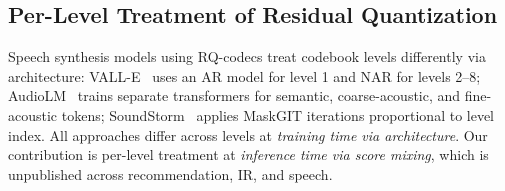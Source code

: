 \subsection{Per-Level Treatment of Residual Quantization}

Speech synthesis models using RQ-codecs treat codebook levels differently via architecture: VALL-E~\cite{wang2023valle} uses an AR model for level 1 and NAR for levels 2–8; AudioLM~\cite{borsos2023audiolm} trains separate transformers for semantic, coarse-acoustic, and fine-acoustic tokens; SoundStorm~\cite{borsos2023soundstorm} applies MaskGIT iterations proportional to level index. All approaches differ across levels at \emph{training time via architecture}. Our contribution is per-level treatment at \emph{inference time via score mixing}, which is unpublished across recommendation, IR, and speech.
